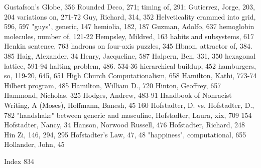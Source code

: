 Gustafson's Globe, 356                             Rounded Deco, 271; timing of, 291;
Gutierrez, Jorge, 203, 204                         variations on, 271-72
Guy, Richard, 314, 352                            Helveticality crammed into grid, 596, 597
"guys", generic, 147                              hemiolia, 182, 187
Guzman, Adolfo, 637                               hemoglobin molecules, number of, 121-22
                                                  Hempsley, Mildred, 163
habits and subsystems, 617                        Henkin sentence, 763
hadrons on four-axis puzzles, 345                 Hbnon, attractor of, 384. 385
Haig, Alexander, 34                               Henry, Jacqueline, 587
Halpern, Ben, 331, 350                            hexagonal lattice, 591-94
halting problem, 486. 534-36                      hierarchical buildup, 452
hamburgers, so, 119-20, 645, 651                  High Church Computationalism, 658
Hamilton, Kathi, 773-74                           Hilbert program, 485
Hamilton, William D., 720                         Hinton, Geoffrey, 657
Hammond, Nicholas, 325                            Hodges, Andrew, 483-91
Handbook of Nonracist Writing, A (Moses),         Hoffmann, Banesh, 45
 160                                              Hofstadter, D. vs. Hofstadter, D., 782
"handshake" between generic and masculine,        Hofstadter, Laura, xix, 709
 154                                              Hofstadter, Nancy, 34
Hanson, Norwood Russell, 476                      Hofstadter, Richard, 248
Hin Zi, 146, 294, 295                             Hofstadter's Law, 47, 48
"happiness", computational, 655                   Hollander, John, 45

 Index                                                                                      834

